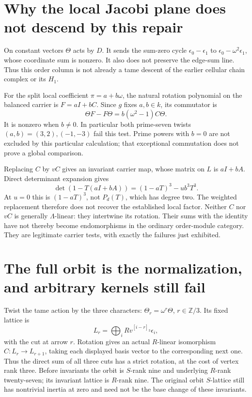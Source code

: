 \section{Why the local Jacobi plane does not descend by this repair}
On constant vectors $\Theta$ acts by $D$. It sends the sum-zero cycle $\epsilon_0-\epsilon_1$ to $\epsilon_0-\omega^2\epsilon_1$, whose coordinate sum is nonzero. It also does not preserve the edge-sum line. Thus this order column is not already a tame descent of the earlier cellular chain complex or its $H_1$.

For the split local coefficient $\pi=a+b\omega$, the natural rotation polynomial on the balanced carrier is $F=aI+bC$. Since $g$ fixes $a,b\in k$, its commutator is
\[
 \Theta F-F\Theta=b(\omega^2-1)C\Theta.
\]
It is nonzero when $b\ne0$. In particular both prime-seven twists $(a,b)=(3,2),(-1,-3)$ fail this test. Prime powers with $b=0$ are not excluded by this particular calculation; that exceptional commutation does not prove a global comparison.

Replacing $C$ by $vC$ gives an invariant carrier map, whose matrix on $L$ is $aI+bA$. Direct determinant expansion gives
\[
 \det(1-T(aI+bA))=(1-aT)^3-ub^3T^3.
\]
At $u=0$ this is $(1-aT)^3$, not $P_d(T)$, which has degree two. The weighted replacement therefore does not recover the established local factor. Neither $C$ nor $vC$ is generally $\Lambda$-linear: they intertwine its rotation. Their sums with the identity have not thereby become endomorphisms in the ordinary order-module category. They are legitimate carrier tests, with exactly the failures just exhibited.

\section{The full orbit is the normalization, and arbitrary kernels still fail}
Twist the tame action by the three characters: $\Theta_r=\omega^r\Theta$, $r\in\mathbb Z/3$. Its fixed lattice is
\[
 L_r=\bigoplus_i Rv^{[i-r]_3}\epsilon_i,
\]
with the cut at arrow $r$. Rotation gives an actual $R$-linear isomorphism $C:L_r\to L_{r+1}$, taking each displayed basis vector to the corresponding next one. Thus the direct sum of all three cuts has a strict rotation, at the cost of vertex rank three. Before invariants the orbit is $S$-rank nine and underlying $R$-rank twenty-seven; its invariant lattice is $R$-rank nine. The original orbit $S$-lattice still has nontrivial inertia at zero and need not be the base change of these invariants.

